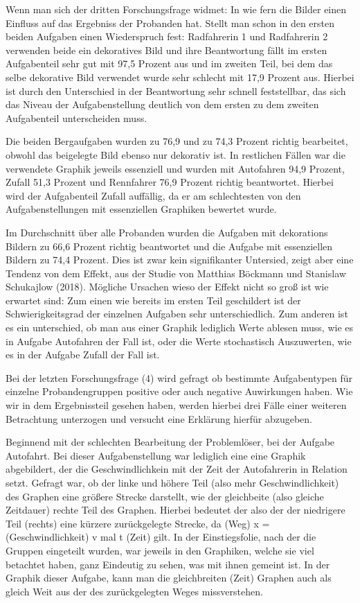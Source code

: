 Wenn man sich der dritten Forschungsfrage widmet: In wie fern die Bilder einen Einfluss auf das Ergebniss der Probanden hat. Stellt man schon in den ersten beiden Aufgaben einen Wiederspruch fest: Radfahrerin 1 und Radfahrerin 2 verwenden beide ein dekoratives Bild und ihre Beantwortung fällt im ersten Aufgabenteil sehr gut mit 97,5 Prozent aus und im zweiten Teil, bei dem das selbe dekorative Bild verwendet wurde sehr schlecht mit 17,9 Prozent aus. Hierbei ist durch den Unterschied in der Beantwortung sehr schnell feststellbar, das sich das Niveau der Aufgabenstellung deutlich von dem ersten zu dem zweiten Aufgabenteil unterscheiden muss.

Die beiden Bergaufgaben wurden zu 76,9 und zu 74,3 Prozent richtig bearbeitet, obwohl das beigelegte Bild ebenso nur dekorativ ist. In restlichen Fällen war die verwendete Graphik jeweils essenziell und wurden mit Autofahren 94,9 Prozent, Zufall 51,3 Prozent und Rennfahrer 76,9 Prozent richtig beantwortet. Hierbei wird der Aufgabenteil Zufall auffällig, da er am schlechtesten von den Aufgabenstellungen mit essenziellen Graphiken bewertet wurde. 

Im Durchschnitt über alle Probanden wurden die Aufgaben mit dekorations Bildern zu 66,6 Prozent richtig beantwortet und die Aufgabe mit essenziellen Bildern zu 74,4 Prozent. Dies ist zwar kein signifikanter Untersied, zeigt aber eine Tendenz von dem  Effekt, aus der Studie von Matthias Böckmann und Stanislaw Schukajlow (2018). Mögliche Ursachen wieso der Effekt nicht so groß ist wie erwartet sind: Zum einen wie bereits im ersten Teil geschildert ist der Schwierigkeitsgrad der einzelnen Aufgaben sehr unterschiedlich. Zum anderen ist es ein unterschied, ob man aus einer Graphik lediglich Werte ablesen muss, wie es in Aufgabe Autofahren der Fall ist, oder die Werte stochastisch Auszuwerten, wie es in der Aufgabe Zufall der Fall ist. 

Bei der letzten Forschungsfrage (4) wird gefragt ob bestimmte Aufgabentypen für einzelne Probandengruppen positive oder auch negative Auwirkungen haben. Wie wir in dem Ergebnissteil gesehen haben, werden hierbei drei Fälle einer weiteren Betrachtung unterzogen und versucht eine Erklärung hierfür abzugeben. 

Beginnend mit der schlechten Bearbeitung der Problemlöser, bei der Aufgabe Autofahrt.  Bei dieser Aufgabenstellung war lediglich eine eine Graphik abgebildert, der die Geschwindlichkein mit der Zeit der Autofahrerin in Relation setzt. Gefragt war, ob der linke und höhere Teil (also mehr Geschwindlichkeit)  des Graphen eine größere Strecke darstellt, wie der gleichbeite (also gleiche Zeitdauer) rechte Teil des Graphen.  Hierbei bedeutet der also der der niedrigere Teil (rechts) eine kürzere zurückgelegte Strecke, da   (Weg) x = (Geschwindlichkeit)  v mal t (Zeit) gilt. In der Einstiegsfolie, nach der die Gruppen eingeteilt wurden, war jeweils in den Graphiken, welche sie viel betachtet haben, ganz Eindeutig zu sehen, was mit ihnen gemeint ist. In der Graphik dieser Aufgabe, kann man die gleichbreiten (Zeit) Graphen auch als gleich Weit aus der des zurückgelegten Weges missverstehen.

